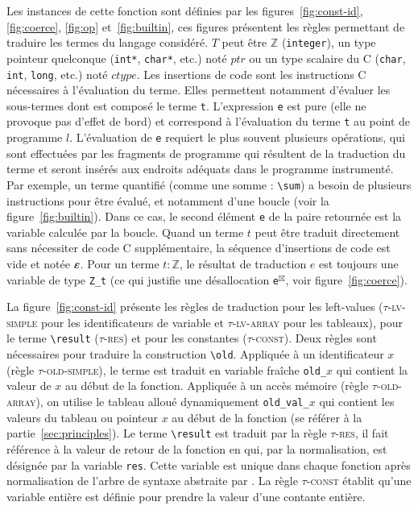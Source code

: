 Les instances de cette fonction sont définies par les
figures~\ref{fig:const-id}, \ref{fig:coerce}, \ref{fig:op} et~\ref{fig:builtin},
ces figures présentent les règles permettant de traduire les termes du langage
\eacsl considéré.
$T$ peut être $\mathbb{Z}$ (\lstinline'integer'), un type pointeur quelconque
(\lstinline'int*', \lstinline'char*', etc.) noté $ptr$ ou un type scalaire du C
(\lstinline'char', \lstinline'int', \lstinline'long', etc.) noté $ctype$.
Les insertions de code sont les instructions C nécessaires à l'évaluation du
terme.
Elles permettent notamment d'évaluer les sous-termes dont est composé le terme
\lstinline't'.
L'expression \lstinline'e' est pure (elle ne provoque pas d'effet de bord) et
correspond à l'évaluation du terme \lstinline't' au point de programme $l$.
L'évaluation de \lstinline'e' requiert le plus souvent plusieurs opérations,
qui sont effectuées par les fragments de programme qui résultent de la
traduction du terme et seront insérés aux endroits adéquats dans le programme
instrumenté.
Par exemple, un terme quantifié (comme une somme : \lstinline'\sum') a besoin de
plusieurs instructions pour être évalué, et notamment d'une boucle (voir la
figure~\ref{fig:builtin}).
Dans ce cas, le second élément \lstinline'e' de la paire retournée est la
variable calculée par la boucle.
Quand un terme $t$ peut être traduit directement sans nécessiter de code C
supplémentaire, la séquence d'insertions de code est vide et notée $\varepsilon$.
Pour un terme $t:\mathbb{Z}$, le résultat de traduction $e$ est toujours une
variable de type \lstinline'Z_t' (ce qui justifie une désallocation
\lstinline{e}${}^{\boxtimes}$, voir figure~\ref{fig:coerce}).



La figure~\ref{fig:const-id} présente les règles de traduction pour les
left-values (\textsc{$\tau$-lv-simple} pour les identificateurs de variable et
\textsc{$\tau$-lv-array} pour les tableaux), pour le terme
\lstinline'\result' (\textsc{$\tau$-res}) et pour les constantes
(\textsc{$\tau$-const}).
Deux règles sont nécessaires pour traduire la construction \eacsl
\lstinline'\old'.
Appliquée à un identificateur $x$ (règle \textsc{$\tau$-old-simple}), le terme
est traduit en variable fraîche \lstinline'old_'$x$ qui contient la valeur de
$x$ au début de la fonction.
Appliquée à un accès mémoire (règle \textsc{$\tau$-old-array}), on utilise le
tableau alloué dynamiquement \lstinline'old_val_'$x$ qui contient les valeurs du
tableau ou pointeur $x$ au début de la fonction (se référer à la
partie~\ref{sec:principles}).
Le terme \lstinline'\result' est traduit par la règle \textsc{$\tau$-res}, il
fait référence à la valeur de retour de la fonction en \eacsl qui, par la
normalisation, est désignée par la variable \lstinline'res'.
Cette variable est unique dans chaque fonction après normalisation de l'arbre de
syntaxe abstraite par \framac.
La règle \textsc{$\tau$-const} établit qu'une variable entière est définie pour
prendre la valeur d'une contante entière.

